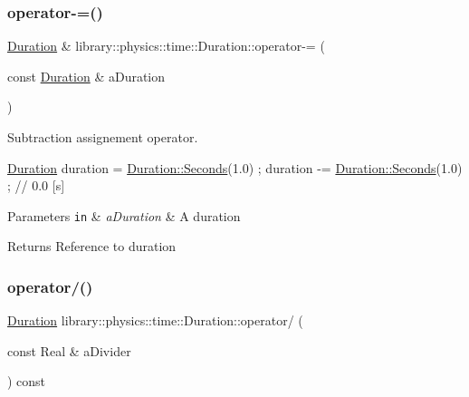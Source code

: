 \subsubsection{\texorpdfstring{operator-\/=()}{operator-=()}}
{\footnotesize\ttfamily \hyperlink{classlibrary_1_1physics_1_1time_1_1_duration}{Duration} \& library\+::physics\+::time\+::\+Duration\+::operator-\/= (\begin{DoxyParamCaption}\item[{const \hyperlink{classlibrary_1_1physics_1_1time_1_1_duration}{Duration} \&}]{a\+Duration }\end{DoxyParamCaption})}



Subtraction assignement operator. 


\begin{DoxyCode}
\hyperlink{classlibrary_1_1physics_1_1time_1_1_duration_a0a70efcf487a841da572afcf00001f64}{Duration} duration = \hyperlink{classlibrary_1_1physics_1_1time_1_1_duration_ae10891c94a1b2278c444cb44b37132f1}{Duration::Seconds}(1.0) ;
duration -= \hyperlink{classlibrary_1_1physics_1_1time_1_1_duration_ae10891c94a1b2278c444cb44b37132f1}{Duration::Seconds}(1.0) ; \textcolor{comment}{// 0.0 [s]}
\end{DoxyCode}



\begin{DoxyParams}[1]{Parameters}
\mbox{\tt in}  & {\em a\+Duration} & A duration \\
\hline
\end{DoxyParams}
\begin{DoxyReturn}{Returns}
Reference to duration 
\end{DoxyReturn}
\mbox{\label{classlibrary_1_1physics_1_1time_1_1_duration_aa1488a4b12024ff181631951758676be}} 
\subsubsection{\texorpdfstring{operator/()}{operator/()}}
{\footnotesize\ttfamily \hyperlink{classlibrary_1_1physics_1_1time_1_1_duration}{Duration} library\+::physics\+::time\+::\+Duration\+::operator/ (\begin{DoxyParamCaption}\item[{const Real \&}]{a\+Divider }\end{DoxyParamCaption}) const}



